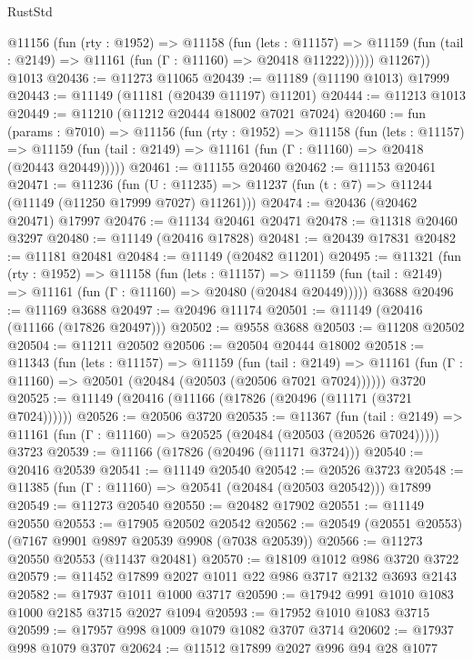 \begin{lexlean}{RustStd}
\begin{coremodule}
          @11156
            (fun (rty : @1952) =>
            @11158
              (fun (lets : @11157) =>
              @11159 (fun (tail : @2149) => @11161 (fun (Γ : @11160) => @20418 @11222))))))
        @11267))
    @1013
@20436 := @11273 @11065
@20439 := @11189 (@11190 @1013) @17999
@20443 := @11149 (@11181 (@20439 @11197) @11201)
@20444 := @11213 @1013
@20449 := @11210 (@11212 @20444 @18002 @7021 @7024)
@20460 := fun (params : @7010) =>
  @11156
    (fun (rty : @1952) =>
    @11158
      (fun (lets : @11157) =>
      @11159 (fun (tail : @2149) => @11161 (fun (Γ : @11160) => @20418 (@20443 @20449)))))
@20461 := @11155 @20460
@20462 := @11153 @20461
@20471 := @11236
    (fun (U : @11235) => @11237 (fun (t : @7) => @11244 (@11149 (@11250 @17999 @7027) @11261)))
@20474 := @20436 (@20462 @20471) @17997
@20476 := @11134 @20461 @20471
@20478 := @11318 @20460 @3297
@20480 := @11149 (@20416 @17828)
@20481 := @20439 @17831
@20482 := @11181 @20481
@20484 := @11149 (@20482 @11201)
@20495 := @11321
    (fun (rty : @1952) =>
    @11158
      (fun (lets : @11157) =>
      @11159 (fun (tail : @2149) => @11161 (fun (Γ : @11160) => @20480 (@20484 @20449)))))
    @3688
@20496 := @11169 @3688
@20497 := @20496 @11174
@20501 := @11149 (@20416 (@11166 (@17826 @20497)))
@20502 := @9558 @3688
@20503 := @11208 @20502
@20504 := @11211 @20502
@20506 := @20504 @20444 @18002
@20518 := @11343
    (fun (lets : @11157) =>
    @11159
      (fun (tail : @2149) =>
      @11161 (fun (Γ : @11160) => @20501 (@20484 (@20503 (@20506 @7021 @7024))))))
    @3720
@20525 := @11149 (@20416 (@11166 (@17826 (@20496 (@11171 (@3721 @7024))))))
@20526 := @20506 @3720
@20535 := @11367
    (fun (tail : @2149) => @11161 (fun (Γ : @11160) => @20525 (@20484 (@20503 (@20526 @7024)))))
    @3723
@20539 := @11166 (@17826 (@20496 (@11171 @3724)))
@20540 := @20416 @20539
@20541 := @11149 @20540
@20542 := @20526 @3723
@20548 := @11385 (fun (Γ : @11160) => @20541 (@20484 (@20503 @20542))) @17899
@20549 := @11273 @20540
@20550 := @20482 @17902
@20551 := @11149 @20550
@20553 := @17905 @20502 @20542
@20562 := @20549 (@20551 @20553) (@7167 @9901 @9897 @20539 @9908 (@7038 @20539))
@20566 := @11273 @20550 @20553 (@11437 @20481)
@20570 := @18109 @1012 @986 @3720 @3722
@20579 := @11452 @17899 @2027 @1011 @22 @986 @3717 @2132 @3693 @2143
@20582 := @17937 @1011 @1000 @3717
@20590 := @17942 @991 @1010 @1083 @1000 @2185 @3715 @2027 @1094
@20593 := @17952 @1010 @1083 @3715
@20599 := @17957 @998 @1009 @1079 @1082 @3707 @3714
@20602 := @17937 @998 @1079 @3707
@20624 := @11512
    @17899
    @2027
    @996
    @94
    @28
    @1077

\end{coremodule}
\end{lexlean}
